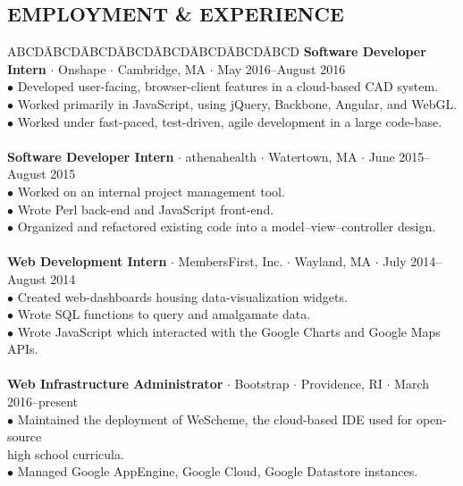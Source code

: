 \documentclass{res}
\newcommand{\myvspace}{\vspace{-0.09in}} %
\newcommand{\sbreak}{\\[-0.15in]}
\begin{document}
\begin{resume}
\section{EMPLOYMENT \& EXPERIENCE} %
   \myvspace
   \begin{tabbing}
        ABCD\=ABCD\=ABCD\=ABCD\=ABCD\=ABCD\=ABCD\=ABCD\kill
        {\bf Software Developer Intern} $\cdot$ Onshape $\cdot$ Cambridge, MA $\cdot$ May 2016--August 2016\\
            \>$\bullet$ Developed user-facing, browser-client features in a cloud-based CAD system.\\
            \>$\bullet$ Worked primarily in JavaScript, using jQuery, Backbone, Angular, and WebGL.\\
            \>$\bullet$ Worked under fast-paced, test-driven, agile development in a large code-base.\\
        \sbreak
        {\bf Software Developer Intern} $\cdot$ athenahealth $\cdot$ Watertown, MA $\cdot$ June 2015--August 2015\\
            \>$\bullet$ Worked on an internal project management tool.\\
            \>$\bullet$ Wrote Perl back-end and JavaScript front-end.\\
            \>$\bullet$ Organized and refactored existing code into a model--view--controller design.\\
        \sbreak
        {\bf Web Development Intern} $\cdot$ MembersFirst, Inc. $\cdot$ Wayland, MA $\cdot$ July 2014--August 2014\\
            \>$\bullet$ Created web-dashboards housing data-visualization widgets.\\
            \>$\bullet$ Wrote SQL functions to query and amalgamate data.\\
            \>$\bullet$ Wrote JavaScript which interacted with the Google Charts and Google Maps APIs.\\
        \sbreak
        {\bf Web Infrastructure Administrator} $\cdot$ Bootstrap $\cdot$ Providence, RI $\cdot$ March 2016--present\\
            \>$\bullet$ Maintained the deployment of WeScheme, the cloud-based IDE used for open-source\\
            \>\phantom{$\bullet$} high school curricula.\\
            \>$\bullet$ Managed Google AppEngine, Google Cloud, Google Datastore instances.\\

\end{tabbing}
\end{resume}
\end{document}
